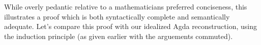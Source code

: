 While overly pedantic relative to a mathematicians preferred conciseness,
this illustrates a proof which is both syntactically complete and semantically
adequate. Let's compare this proof with our idealized Agda reconstruction, using
the induction principle (as given earlier with the arguements commuted).

\begin{code}%
\>[0]\AgdaSpace{}%
\AgdaSymbol{:}\AgdaSpace{}%
\AgdaSymbol{(}\AgdaSpace{}%
\AgdaSpace{}%
\AgdaSpace{}%
\AgdaSymbol{:}\AgdaSpace{}%
\AgdaSymbol{)}\AgdaSpace{}%
\AgdaSpace{}%
\AgdaSymbol{((}\AgdaSpace{}%
\AgdaOperator{\AgdaFunction{+}}\AgdaSpace{}%
\AgdaSymbol{)}\AgdaSpace{}%
\AgdaOperator{\AgdaFunction{+}}\AgdaSpace{}%
\AgdaSymbol{)}\AgdaSpace{}%
\AgdaSpace{}%
\AgdaSymbol{(}\AgdaSpace{}%
\AgdaOperator{\AgdaFunction{+}}\AgdaSpace{}%
\AgdaSymbol{(}\AgdaSpace{}%
\AgdaOperator{\AgdaFunction{+}}\AgdaSpace{}%
\AgdaSymbol{))}\<%
\\
\>[0]\AgdaSpace{}%
\AgdaSpace{}%
\AgdaSpace{}%
\AgdaSpace{}%
\AgdaSymbol{=}\AgdaSpace{}%
\AgdaSpace{}%
\AgdaSpace{}%
\AgdaSpace{}%
\AgdaSpace{}%
\AgdaSpace{}%
\AgdaSpace{}%
\AgdaSpace{}%
\AgdaSpace{}%
\AgdaSymbol{(}\AgdaSpace{}%
\AgdaSpace{}%
\AgdaSymbol{))}\AgdaSpace{}%
\<%
\\
\>[0][@{}l@{\AgdaIndent{0}}]%
\>[2]\<%
\\
\>[2][@{}l@{\AgdaIndent{0}}]%
\>[4]\AgdaSpace{}%
\AgdaSymbol{:}\AgdaSpace{}%
\AgdaSymbol{(}\AgdaSpace{}%
\AgdaOperator{\AgdaFunction{+}}\AgdaSpace{}%
\AgdaSpace{}%
\AgdaOperator{\AgdaFunction{+}}\AgdaSpace{}%
\AgdaSymbol{)}\AgdaSpace{}%
\AgdaSpace{}%
\AgdaSymbol{(}\AgdaSpace{}%
\AgdaOperator{\AgdaFunction{+}}\AgdaSpace{}%
\AgdaSymbol{(}\AgdaSpace{}%
\AgdaOperator{\AgdaFunction{+}}\AgdaSpace{}%
\AgdaSymbol{))}\<%
\\
%
\>[4]\AgdaSpace{}%
\AgdaSymbol{=}\AgdaSpace{}%
\<%

\end{code}
